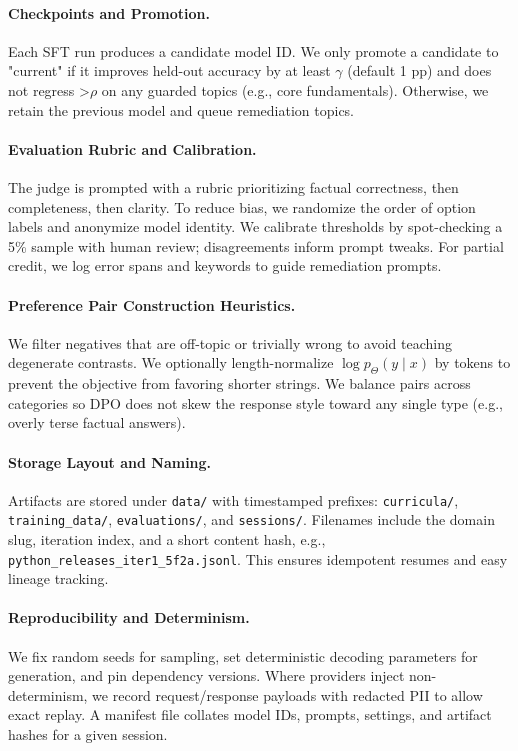 \documentclass[11pt]{article}
\begin{document}
\paragraph{Checkpoints and Promotion.} Each SFT run produces a candidate model ID. We only promote a candidate to "current" if it improves held-out accuracy by at least \(\gamma\) (default 1 pp) and does not regress >\(\rho\) on any guarded topics (e.g., core fundamentals). Otherwise, we retain the previous model and queue remediation topics.

\paragraph{Evaluation Rubric and Calibration.} The judge is prompted with a rubric prioritizing factual correctness, then completeness, then clarity. To reduce bias, we randomize the order of option labels and anonymize model identity. We calibrate thresholds by spot-checking a 5\% sample with human review; disagreements inform prompt tweaks. For partial credit, we log error spans and keywords to guide remediation prompts.

\paragraph{Preference Pair Construction Heuristics.} We filter negatives that are off-topic or trivially wrong to avoid teaching degenerate contrasts. We optionally length-normalize $\log p_\Theta(y\mid x)$ by tokens to prevent the objective from favoring shorter strings. We balance pairs across categories so DPO does not skew the response style toward any single type (e.g., overly terse factual answers).

\paragraph{Storage Layout and Naming.} Artifacts are stored under \verb|data/| with timestamped prefixes: \verb|curricula/|, \verb|training_data/|, \verb|evaluations/|, and \verb|sessions/|. Filenames include the domain slug, iteration index, and a short content hash, e.g., \verb|python_releases_iter1_5f2a.jsonl|. This ensures idempotent resumes and easy lineage tracking.

\paragraph{Reproducibility and Determinism.} We fix random seeds for sampling, set deterministic decoding parameters for generation, and pin dependency versions. Where providers inject non-determinism, we record request/response payloads with redacted PII to allow exact replay. A manifest file collates model IDs, prompts, settings, and artifact hashes for a given session.
\end{document}
